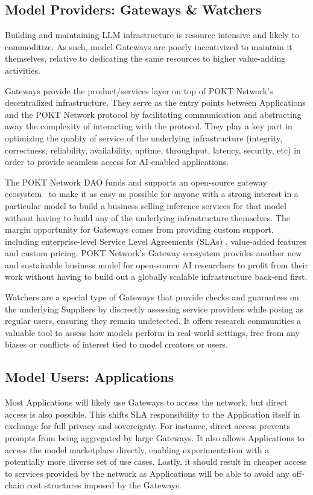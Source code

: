 \documentclass[conference,compsoc]{IEEEtran}
\begin{document}
\subsection{Model Providers: Gateways \& Watchers}

Building and maintaining LLM infrastructure is resource intensive and likely to commoditize. As such, model Gateways are poorly incentivized to maintain it themselves, relative to dedicating the same resources to higher value-adding activities.

Gateways provide the product/services layer on top of POKT Network’s decentralized infrastructure. They serve as the entry points between Applications and the POKT Network protocol by facilitating communication and abstracting away the complexity of interacting with the protocol. They play a key part in optimizing the quality of service of the underlying infrastructure (integrity, correctness, reliability, availability, uptime, throughput, latency, security, etc) in order to provide seamless access for AI-enabled applications.

The POKT Network DAO funds and supports an open-source gateway ecosystem~\cite{poktGatewayServer} to make it as easy as possible for anyone with a strong interest in a particular model to build a business selling inference services for that model without having to build any of the underlying infrastructure themselves. The margin opportunity for Gateways comes from providing custom support, including enterprise-level Service Level Agreements (SLAs) \cite{groveSLA}, value-added features and custom pricing. POKT Network’s Gateway ecosystem provides another new and sustainable business model for open-source AI researchers to profit from their work without having to build out a globally scalable infrastructure back-end first.

Watchers are a special type of Gateways that provide checks and guarantees on the underlying Suppliers by discreetly assessing service providers while posing as regular users, ensuring they remain undetected. It offers research communities a valuable tool to assess how models perform in real-world settings, free from any biases or conflicts of interest tied to model creators or users.


\subsection{Model Users: Applications}

Most Applications will likely use Gateways to access the network, but direct access is also possible. This shifts SLA responsibility to the Application itself in exchange for full privacy and sovereignty. For instance, direct access prevents prompts from being aggregated by large Gateways. It also allows Applications to access the model marketplace directly, enabling experimentation with a potentially more diverse set of use cases. Lastly, it should result in cheaper access to services provided by the network as Applications will be able to avoid any off-chain cost structures imposed by the Gateways.
\end{document}
